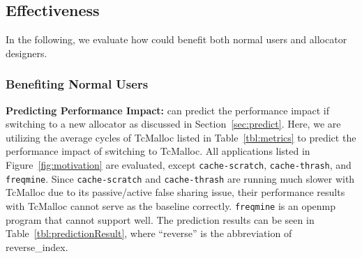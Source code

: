 \subsection{Effectiveness}
\label{sec:effectiveness}

In the following, we evaluate how \MP{} could benefit both normal users and allocator designers. 

\subsubsection{Benefiting Normal Users\\} 
\label{sec:normalusers}

\noindent \textbf{Predicting Performance Impact:} 
\MP{} can predict the performance impact if switching to a new allocator as discussed in Section~\ref{sec:predict}. Here, we are utilizing the average cycles of TcMalloc listed in Table~\ref{tbl:metrics} to predict the performance impact of switching to TcMalloc. All applications listed in Figure~\ref{fig:motivation} are evaluated, except \texttt{cache-scratch},  \texttt{cache-thrash}, and \texttt{freqmine}.  Since \texttt{cache-scratch} and \texttt{cache-thrash} are running much slower with TcMalloc due to its passive/active false sharing issue, their performance results with TcMalloc cannot serve as the baseline correctly. \texttt{freqmine} is an openmp program that \MP{} cannot support well. The prediction results can be seen in Table~\ref{tbl:predictionResult}, where ``reverse'' is the abbreviation of reverse\_index. 

